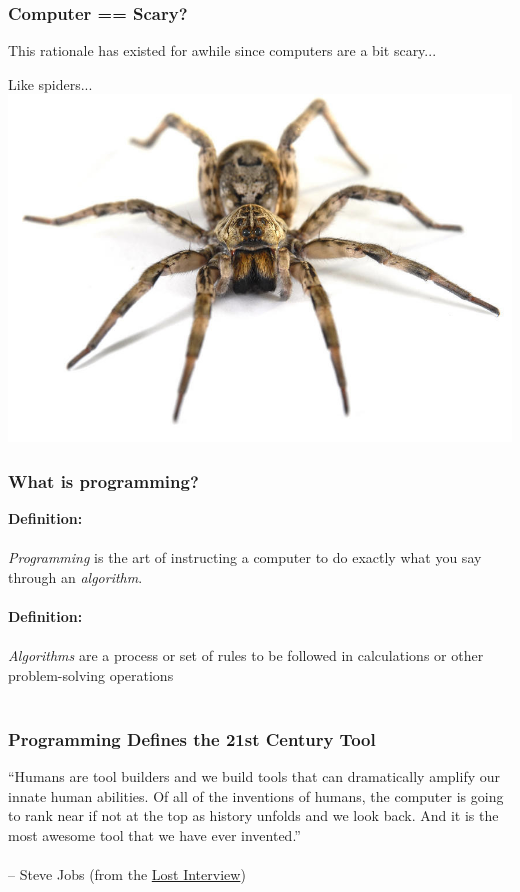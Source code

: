 \documentclass{beamer}\usepackage[]{graphicx}\usepackage[]{color}
\begin{document}
\begin{frame}
\frametitle{Computer == Scary?}

This rationale has existed for awhile since computers are a bit scary...

Like spiders...\\

\centering
\includegraphics{wolf_spider.jpg}

\end{frame}



\begin{frame}
\frametitle{What is programming?}

\textbf{Definition:} \\$ $\\

\textit{Programming} is the art of instructing a computer to do exactly what you say through an \emph{algorithm}.\\$ $\\

\textbf{Definition:} \\$ $\\

\textit{Algorithms} are a process or set of rules to be followed in calculations or other problem-solving operations\\$ $\\

\end{frame}



\begin{frame}
\frametitle{Programming Defines the 21st Century Tool}

{\LARGE
``Humans are tool builders and we build tools that can dramatically amplify our innate human abilities. Of all of the inventions of humans, the computer is going to rank near if not at the top as history unfolds and we look back. And it is the most awesome tool that we have ever invented.''
}
\\$ $\\

-- Steve Jobs (from the \href{https://www.youtube.com/watch?v=_isT7GWplbs}{Lost Interview})

\end{frame}
\end{document}
